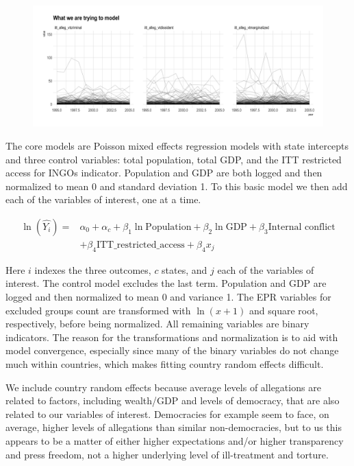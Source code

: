 \documentclass[12pt]{article}
\begin{document}
\begin{figure}
\includegraphics[width=.9\textwidth]{../output/figures/outcome-time-series.png}
\end{figure}

The core models are Poisson mixed effects regression models with state intercepts and three control variables: total population, total GDP, and the ITT restricted access for INGOs indicator. Population and GDP are both logged and then normalized to mean 0 and standard deviation 1. To this basic model we then add each of the variables of interest, one at a time. 

$$
\begin{aligned}
\ln(\hat{Y_i}) =& \alpha_0 + \alpha_c + \beta_1 \ln \textrm{Population} + \beta_2 \ln \textrm{GDP} + \beta_3 \textrm{Internal conflict} \\
& + \beta_4 \textrm{ITT\_restricted\_access} + \beta_4 x_j 
\end{aligned}
$$

Here $i$ indexes the three outcomes, $c$ states, and $j$ each of the variables of interest. The control model excludes the last term. Population and GDP are logged and then normalized to mean 0 and variance 1. The EPR variables for excluded groups count are transformed with $\ln(x + 1)$ and square root, respectively, before being normalized. All remaining variables are binary indicators. The reason for the transformations and normalization is to aid with model convergence, especially since many of the binary variables do not change much within countries, which makes fitting country random effects difficult. 

We include country random effects because average levels of allegations are related to factors, including wealth/GDP and levels of democracy, that are also related to our variables of interest. Democracies for example seem to face, on average, higher levels of allegations than similar non-democracies, but to us this appears to be a matter of either higher expectations and/or higher transparency and press freedom, not a higher underlying level of ill-treatment and torture. 
\end{document}
